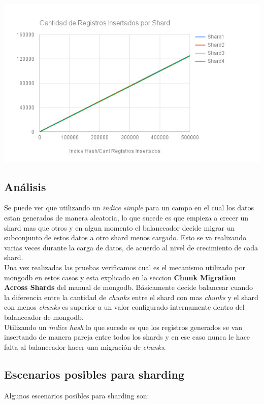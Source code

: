  \includegraphics[width=\linewidth]{IndiceHashChart.png}
 
\pagebreak
\subsection{Análisis}

Se puede ver que  utilizando un \textit{indice simple} para un campo en el cual los datos estan generados de manera aleatoria, lo que sucede es que empieza a crecer un shard mas que otros y en algun momento el balanceador decide migrar un subconjunto de estos datos a otro shard menos cargado. Esto se va realizando varias veces durante la carga de datos, de acuerdo al nivel de crecimiento de cada shard.\\
Una vez realizadas las pruebas verificamos cual es el mecanismo utilizado por mongodb en estos casos y esta explicado en la seccion \textbf{Chunk Migration Across Shards} del manual de mongodb. Básicamente decide balancear cuando la diferencia entre la cantidad de \textit{chunks} entre el shard con mas \textit{chunks}  y el shard con menos \textit{chunks} es superior a un valor configurado internamente dentro del balanceador de mongodb.\\
Utilizando un \textit{indice hash} lo que sucede es que los registros generados se van insertando de manera pareja entre todos los shards y en ese caso nunca le hace falta al balanceador hacer una migración de \textit{chunks}.

\subsection{Escenarios posibles para sharding}
Algunos escenarios posibles para sharding son:\\

